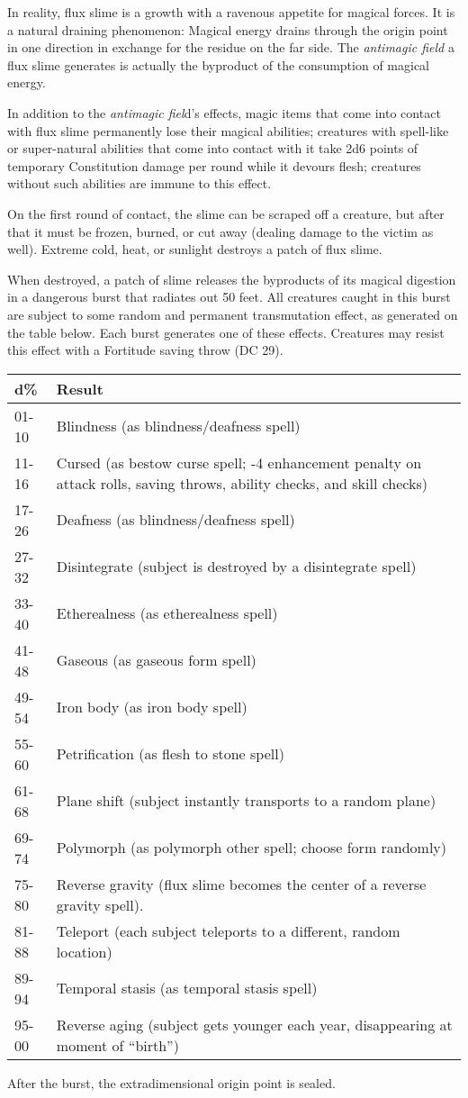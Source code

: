 \documentclass{article}
\begin{document}
In reality, flux slime is a growth with a ravenous appetite for magical forces. 
It is a natural draining phenomenon: Magical energy drains through the origin point 
in one direction in exchange for the residue on the far side. The \textit{antimagic 
field }a flux slime generates is actually the byproduct of the consumption of magical 
energy. 

In addition to the \textit{antimagic fiel}d's effects, magic items that come into 
contact with flux slime permanently lose their magical abilities; creatures with 
spell-like or super-natural abilities that come into contact with it take 2d6 points 
of temporary Constitution damage per round while it devours flesh; creatures without 
such abilities are immune to this effect. 

On the first round of contact, the slime can be scraped off a creature, but after 
that it must be frozen, burned, or cut away (dealing damage to the victim as well). 
Extreme cold, heat, or sunlight destroys a patch of flux slime. 

When destroyed, a patch of slime releases the byproducts of its magical digestion 
in a dangerous burst that radiates out 50 feet. All creatures caught in this burst 
are subject to some random and permanent transmutation effect, as generated on 
the table below. Each burst generates one of these effects. Creatures may resist 
this effect with a Fortitude saving throw (DC 29).

\begin{tabular}{|>{\raggedright}p{20pt}|>{\raggedright}p{301pt}|}
\hline
d\textbf{\%} & R\textbf{esult }\tabularnewline
\hline
01-10 & Blindness (as blindness/deafness spell) \tabularnewline
\hline
11-16 & Cursed (as bestow curse spell; -4 enhancement penalty on attack rolls, 
saving throws, ability checks, and skill checks)\tabularnewline
\hline
17-26 & Deafness (as blindness/deafness spell) \tabularnewline
\hline
27-32 & Disintegrate (subject is destroyed by a disintegrate spell) \tabularnewline
\hline
33-40 & Etherealness (as etherealness spell) \tabularnewline
\hline
41-48 & Gaseous (as gaseous form spell) \tabularnewline
\hline
49-54 & Iron body (as iron body spell) \tabularnewline
\hline
55-60 & Petrification (as flesh to stone spell) \tabularnewline
\hline
61-68 & Plane shift (subject instantly transports to a random plane) \tabularnewline
\hline
69-74 & Polymorph (as polymorph other spell; choose form randomly) \tabularnewline
\hline
75-80 & Reverse gravity (flux slime becomes the center of a reverse gravity spell). 
\tabularnewline
\hline
81-88 & Teleport (each subject teleports to a different,  random location)\tabularnewline
\hline
89-94 & Temporal stasis (as temporal stasis spell) \tabularnewline
\hline
95-00 & Reverse aging (subject gets younger each year, disappearing at moment of 
``birth'')\tabularnewline
\hline
\end{tabular}

After the burst, the extradimensional origin point is sealed.

\newpage
\end{document}
